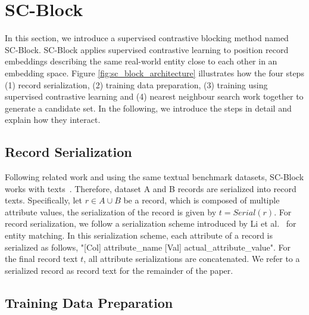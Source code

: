 \documentclass[sigconf,nonacm]{acmart}
\begin{document}
 \section{SC-Block}
\label{sec:sc_block}

In this section, we introduce a supervised contrastive blocking method named SC-Block. SC-Block applies supervised contrastive learning to position record embeddings describing the same real-world entity close to each other in an embedding space.
Figure \ref{fig:sc_block_architecture} illustrates how the four steps (1) record serialization, (2) training data preparation, (3) training using supervised contrastive learning and (4) nearest neighbour search work together to generate a candidate set. In the following, we introduce the steps in detail and explain how they interact.

\subsection{Record Serialization}
\label{sub-sec:serialization}

Following related work and using the same textual benchmark datasets, SC-Block works with texts~\cite{li_deep_2020, wang_sudowoodo_2022, thirumuruganathan_deep_2021}. 
Therefore, dataset A and B records are serialized into record texts. 
Specifically, let $r\in A\cup B$ be a record, which is composed of multiple attribute values, the serialization of the record is given by $t = Serial(r)$.
For record serialization, we follow a serialization scheme introduced by Li et al.~\cite{li_deep_2020} for entity matching. 
In this serialization scheme, each attribute of a record is serialized as follows, 
"[Col] attribute\_name [Val] actual\_attribute\_value".
For the final record text $t$, all attribute serializations are concatenated.
We refer to a serialized record as record text for the remainder of the paper.

\subsection{Training Data Preparation}
\label{sub-sec:training_data}
\end{document}
